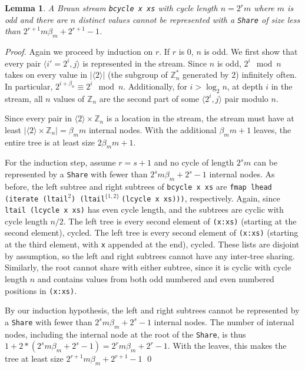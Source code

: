 \documentclass{llncs}
\newtheorem{lemma}[theorem]{Lemma}
\begin{document}
\begin{lemma}
A Braun stream {\tt bcycle x xs} with cycle length $n = 2^r m$ where $m$ is odd and there are $n$ distinct values cannot be represented with a {\tt Share} of size less than $2^{r+1} m \beta_m + 2^{r+1} - 1$.
\end{lemma}
\begin{proof}

Again we proceed by induction on $r$.
If $r$ is $0$, $n$ is odd.
We first show that every pair $\langle i'=2^i,j \rangle$ is represented in the stream.
Since $n$ is odd, $2^i \mod n$ takes on every value in $|\langle 2 \rangle|$ (the subgroup of $\mathbb{Z}_n^*$ generated by $2$) infinitely often.
In particular, $2^{i+\beta_n} \equiv 2^i \mod n$.
Additionally, for $i > \log_2 n$, at depth $i$ in the stream, all $n$ values of $\mathbb{Z}_n$ are the second part of some $\langle 2^i,j\rangle$ pair modulo $n$.

Since every pair in $\langle 2 \rangle \times \mathbb{Z}_n$ is a location in the stream, the stream must have at least $|\langle 2 \rangle \times \mathbb{Z}_n| = \beta_m m$ internal nodes.
With the additional $\beta_m m + 1$ leaves, the entire tree is at least size $2 \beta_m m + 1$.

For the induction step, assume $r = s+1$ and no cycle of length $2^s m$ can be represented by a {\tt Share} with fewer than $2^s m \beta_m + 2^s - 1$ internal nodes.
As before, the left subtree and right subtrees of {\tt bcycle x xs} are {\tt fmap lhead (iterate (ltail}$^2${\tt ) (ltail}$^{\{1,2\}}\ ${\tt (lcycle x xs)))}, respectively.
Again, since {\tt ltail (lcycle x xs)} has even cycle length, and the subtrees are cyclic with cycle length $n/2$.
The left tree is every second element of {\tt (x:xs)} (starting at the second element), cycled.
The left tree is every second element of {\tt (x:xs)} (starting at the third element, with {\tt x} appended at the end), cycled.
These lists are disjoint by assumption, so the left and right subtrees cannot have any inter-tree sharing.
Similarly, the root cannot share with either subtree, since it is cyclic with cycle length $n$ and contains values from both odd numbered and even numbered positions in {\tt (x:xs)}.

By our induction hypothesis, the left and right subtrees cannot be represented by a {\tt Share} with fewer than $2^s m \beta_m + 2^s - 1$ internal nodes.
The number of internal nodes, including the internal node at the root of the {\tt Share}, is thus $1+2*(2^s m \beta_m + 2^s - 1) = 2^r m \beta_m + 2^r - 1$.
With the leaves, this makes the tree at least size $2^{r+1} m \beta_m + 2^{r+1} - 1$
\qed
\end{proof}
\end{document}
